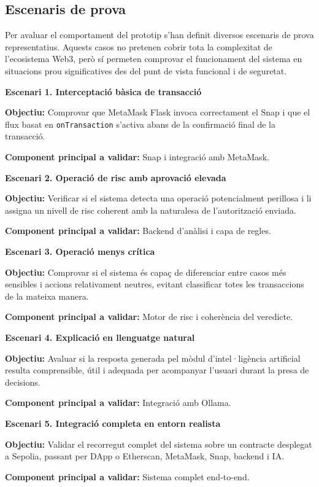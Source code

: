 \subsection{Escenaris de prova}

Per avaluar el comportament del prototip s’han definit diversos escenaris de prova representatius. Aquests casos no pretenen cobrir tota la complexitat de l’ecosistema Web3, però sí permeten comprovar el funcionament del sistema en situacions prou significatives des del punt de vista funcional i de seguretat.

\textbf{Escenari 1. Interceptació bàsica de transacció}

\textbf{Objectiu:} Comprovar que MetaMask Flask invoca correctament el Snap i que el flux basat en \texttt{onTransaction} s’activa abans de la confirmació final de la transacció.

\textbf{Component principal a validar:} Snap i integració amb MetaMask.

\vspace{0.5em}

\textbf{Escenari 2. Operació de risc amb aprovació elevada}

\textbf{Objectiu:} Verificar si el sistema detecta una operació potencialment perillosa i li assigna un nivell de risc coherent amb la naturalesa de l’autorització enviada.

\textbf{Component principal a validar:} Backend d’anàlisi i capa de regles.

\vspace{0.5em}

\textbf{Escenari 3. Operació menys crítica}

\textbf{Objectiu:} Comprovar si el sistema és capaç de diferenciar entre casos més sensibles i accions relativament neutres, evitant classificar totes les transaccions de la mateixa manera.

\textbf{Component principal a validar:} Motor de risc i coherència del veredicte.

\vspace{0.5em}

\textbf{Escenari 4. Explicació en llenguatge natural}

\textbf{Objectiu:} Avaluar si la resposta generada pel mòdul d’intel·ligència artificial resulta comprensible, útil i adequada per acompanyar l’usuari durant la presa de decisions.

\textbf{Component principal a validar:} Integració amb Ollama.

\vspace{0.5em}

\textbf{Escenari 5. Integració completa en entorn realista}

\textbf{Objectiu:} Validar el recorregut complet del sistema sobre un contracte desplegat a Sepolia, passant per DApp o Etherscan, MetaMask, Snap, backend i IA.

\textbf{Component principal a validar:} Sistema complet end-to-end.